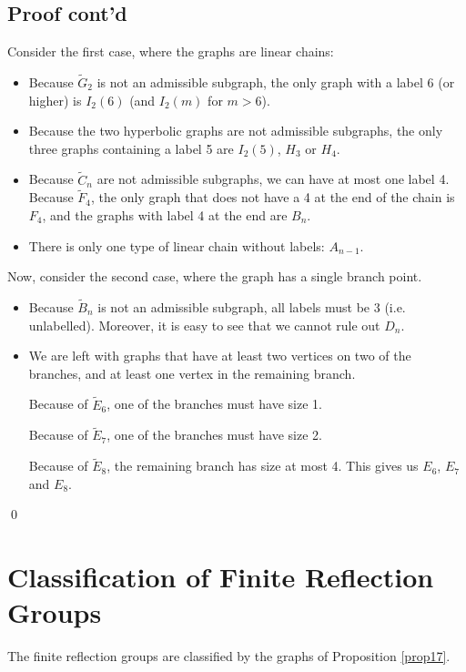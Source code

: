 \subsection{Proof cont'd}

Consider the first case, where the graphs are linear chains:

\begin{itemize}
\item
Because $\widetilde{G}_2$ is not an admissible subgraph, the only graph with a
label 6 (or higher) is $I_2(6)$ (and $I_2(m)$ for $m > 6$).
\item
Because the two hyperbolic graphs are not admissible subgraphs, the only three
graphs containing a label 5 are $I_2(5)$, $H_3$ or $H_4$.
\item
Because $\widetilde{C}_n$ are not admissible subgraphs, we can have at most
one label 4. Because $\widetilde{F}_4$, the only graph that does not have a 4
at the end of the chain is $F_4$, and the graphs with label 4 at the end are
$B_n$.
\item
There is only one type of linear chain without labels: $A_{n-1}$.
\end{itemize}

Now, consider the second case, where the graph has a single branch point.

\begin{itemize}
\item
Because $\widetilde{B}_n$ is not an admissible subgraph, all labels must be
3 (i.e. unlabelled). Moreover, it is easy to see that we cannot rule out
$D_n$.
\item
We are left with graphs that have at least two vertices on two of the branches,
and at least one vertex in the remaining branch.

Because of $\widetilde{E}_6$, one of the branches must have size 1.

Because of $\widetilde{E}_7$, one of the branches must have size 2.

Because of $\widetilde{E}_8$, the remaining branch has size at most 4. This
gives us $E_6$, $E_7$ and $E_8$.
\end{itemize}

\qed

\section{Classification of Finite Reflection Groups}

\begin{theorem} \label{thm18}
The finite reflection groups are classified by the graphs of Proposition
\ref{prop17}.
\end{theorem}

